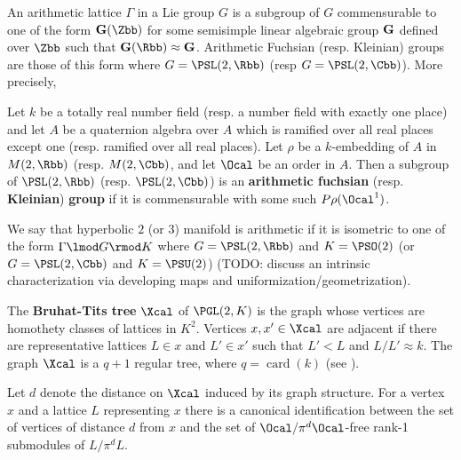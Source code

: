 An arithmetic lattice $\Gamma$ in a Lie group $G$ is a subgroup of $G$ commensurable to one of the form $\bf{G}(\Zbb)$ for some semisimple linear algebraic group $\bf{G}$ defined over $\Zbb$ such that $\bf{G}(\Rbb) \approx G$. Arithmetic Fuchsian (resp. Kleinian) groups are those of this form where $G = \PSL(2,\Rbb)$ (resp $G= \PSL(2,\Cbb)$). More precisely,

\begin{definition}\label{def:arithFuchsianKleinian}
	Let $k$ be a totally real number field (resp. a number field with exactly one place) and let $A$ be a quaternion algebra over $A$ which is ramified over all real places except one (resp. ramified over all real places). Let $\rho$ be a $k$-embedding of $A$ in $M(2,\Rbb)$ (resp. $M(2,\Cbb)$, and let $\Ocal$ be an order in $A$. Then a subgroup of $\PSL(2,\Rbb)$ (resp. $\PSL(2,\Cbb)$) is an \textbf{arithmetic fuchsian} (resp. \textbf{Kleinian})\textbf{ group} if it is commensurable with some such $P\rho(\Ocal^1)$.
\end{definition}

We say that  hyperbolic $2$ (or $3$) manifold is arithmetic if it is isometric to one of the form $\Gamma \lmod G \rmod K$ where $G= \PSL(2,\Rbb)$ and $K = \PSO(2)$ (or $G= \PSL(2,\Cbb)$ and $K = \PSU(2)$) (TODO: discuss an intrinsic characterization via developing maps and uniformization/geometrization).






The \textbf{Bruhat-Tits tree} $\Xcal$ of $\PGL(2,K)$ is the graph whose vertices are homothety classes of lattices in $K^2$. Vertices $x,x' \in \Xcal$ are adjacent if there are representative lattices $L \in x$ and $L' \in x'$ such that $L' < L$ and $L/L' \approx k$.  The graph $\Xcal$ is a $q+1$ regular tree, where $q = \operatorname{card}(k)$ (see \cite{serreTrees2003}).

Let $d$ denote the distance on $\Xcal$ induced by its graph structure. For a vertex $x$ and a lattice $L$ representing $x$ there is a canonical identification between the set of vertices of distance $d$ from $x$ and the set of $\Ocal/\pi^d \Ocal$-free rank-1 submodules of $L / \pi^d L$.

